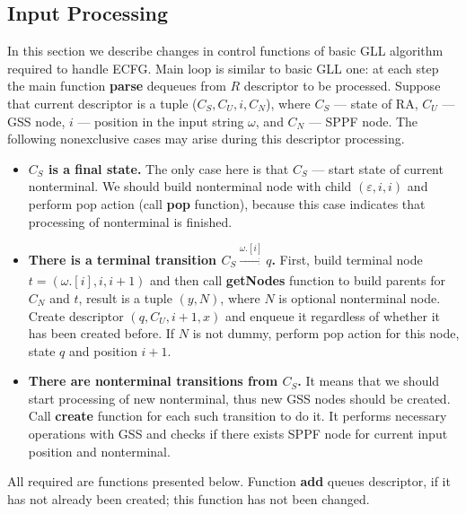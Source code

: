 \documentclass[runningheads,a4paper]{llncs}
\begin{document}
\subsection{Input Processing}%

In this section we describe changes in control functions of basic GLL algorithm required to handle ECFG.
Main loop is similar to basic GLL one: at each step the main function \textbf{parse} dequeues from $R$ descriptor to be processed.
Suppose that current descriptor is a tuple ($C_S, C_U, i, C_N$), where $C_S$ --- state of RA,
$C_U$ --- GSS node, $i$ --- position in the input string $\omega$, and $C_N$ --- SPPF node. 
The following nonexclusive cases may arise during this descriptor processing.

\begin{itemize} 
    \item \textbf{$C_S$ is a final state.} The only case here is that $C_S$ --- start state of current nonterminal. 
    We should build nonterminal node with child $(\varepsilon, i, i)$ and perform pop action
    (call \textbf{pop} function), because this case indicates that processing of nonterminal is finished.
    
    \item \textbf{There is a terminal transition $C_S \xrightarrow[]{\omega.[i]} q$.} 
    First, build terminal node $ t = (\omega.[i], i, i+1) $ and then call \textbf{getNodes} function
    to build parents for $ C_N $ and $ t $, result is a tuple $ (y, N) $, where $N$ is optional nonterminal node.
    Create descriptor $ (q, C_U, i+1, x) $ and enqueue it regardless of whether it has been created before.
    If $ N $ is not dummy, perform pop action for this node, state $ q $ and position $i + 1 $.
    
    \item\textbf{ There are nonterminal transitions from $C_S$.}
    It means that we should start processing of new nonterminal, thus new GSS nodes should be created.
    Call \textbf{create} function for each such transition to do it.
    It performs necessary operations with GSS and checks if there exists SPPF node for current input position and nonterminal.
\end{itemize}

All required are functions presented below.
Function \textbf{add} queues descriptor, if it has not already been created; this function has not been changed.

\end{document}
